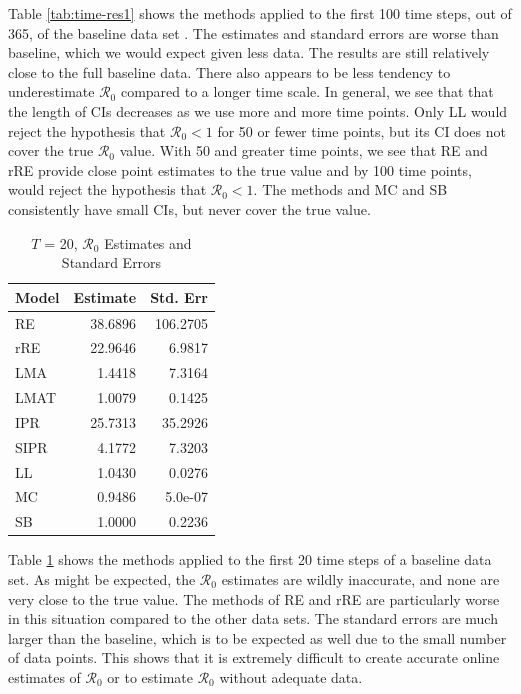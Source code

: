 \documentclass[12pt]{article}
\newcommand{\rr}{\ensuremath{\mathcal{R}_0}}
\begin{document}
Table \ref{tab:time-res1} shows the methods applied to the first 100 time steps, out of 365, of the baseline data set . The estimates and standard errors are worse than baseline, which we would expect given less data. The results are still relatively close to the full baseline data. There also appears to be less tendency to underestimate $\rr$ compared to a longer time scale.  In general, we see that that the length of CIs decreases as we use more and more time points.  Only LL would reject the hypothesis that $\rr < 1$ for 50 or fewer time points, but its CI does not cover the true $\rr$ value.  With 50 and greater time points, we see that RE and rRE provide close point estimates to the true value and by 100 time points, would reject the hypothesis that $\rr < 1$.  The methods and MC and SB consistently have small CIs, but never cover the true value.

\begin{table}[H]
  \centering
	\begin{tabular}[t]{l|r|r}
		\hline
		Model & Estimate & Std. Err\\
		\hline
		RE & 38.6896 & 106.2705\\
		\hline
		rRE & 22.9646 & 6.9817\\
		\hline
		LMA & 1.4418 & 7.3164\\
		\hline
		LMAT & 1.0079 & 0.1425\\
		\hline
		IPR & 25.7313 & 35.2926\\
		\hline
		SIPR & 4.1772 & 7.3203\\
		\hline
		LL & 1.0430 & 0.0276\\
		\hline
		MC & 0.9486 & 5.0e-07\\
		\hline
		SB & 1.0000 & 0.2236\\
		\hline
	\end{tabular}
        \caption{$T$ = 20, $\rr$ Estimates and Standard Errors}\label{tab:time-res2}
\end{table}

Table \ref{tab:time-res2} shows the methods applied to the first 20 time steps of a baseline data set. As might be expected, the $\rr$ estimates are wildly inaccurate, and none are very close to the true value. The methods of RE and rRE are particularly worse in this situation compared to the other data sets. The standard errors are much larger than the baseline, which is to be expected as well due to the small number of data points. This shows that it is extremely difficult to create accurate online estimates of $\rr$ or to estimate $\rr$ without adequate data. 
\end{document}
